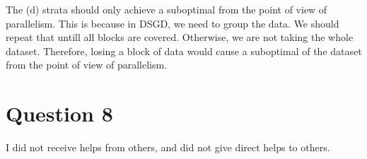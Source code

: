\documentclass{article} %
\begin{document}
The (d) strata should only achieve a suboptimal from the point of
view of parallelism. This is because in DSGD, we need to group the data. We should
repeat that untill all blocks are covered. Otherwise, we are not taking the whole
dataset. Therefore, losing a block of data would cause a suboptimal of the dataset from the point
of view of parallelism.



\section{Question 8}

I did not receive helps from others, and did not give direct helps to others.
\end{document}
